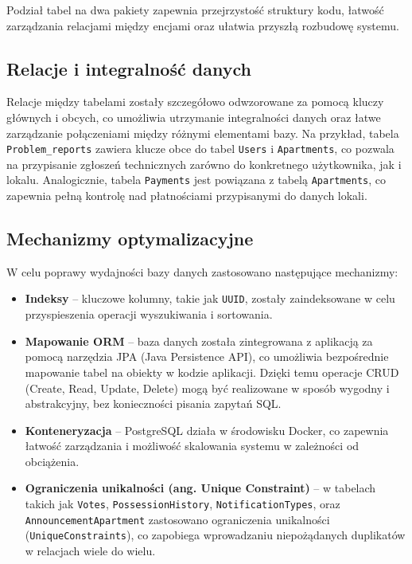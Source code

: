 Podział tabel na dwa pakiety zapewnia przejrzystość struktury kodu, łatwość zarządzania relacjami między encjami oraz ułatwia przyszłą rozbudowę systemu.


\subsection{Relacje i integralność danych}

Relacje między tabelami zostały szczegółowo odwzorowane za pomocą kluczy głównych i obcych, co umożliwia utrzymanie integralności danych oraz łatwe zarządzanie połączeniami między różnymi elementami bazy. Na przykład, tabela \texttt{Problem\_reports} zawiera klucze obce do tabel \texttt{Users} i \texttt{Apartments}, co pozwala na przypisanie zgłoszeń technicznych zarówno do konkretnego użytkownika, jak i lokalu. Analogicznie, tabela \texttt{Payments} jest powiązana z tabelą \texttt{Apartments}, co zapewnia pełną kontrolę nad płatnościami przypisanymi do danych lokali.

\subsection{Mechanizmy optymalizacyjne}

W celu poprawy wydajności bazy danych zastosowano następujące mechanizmy:
\begin{itemize}
    \item \textbf{Indeksy} -- kluczowe kolumny, takie jak \texttt{UUID}, zostały zaindeksowane w celu przyspieszenia operacji wyszukiwania i sortowania.
    \item \textbf{Mapowanie ORM} -- baza danych została zintegrowana z aplikacją za pomocą narzędzia JPA (Java Persistence API), co umożliwia bezpośrednie mapowanie tabel na obiekty w kodzie aplikacji. Dzięki temu operacje CRUD (Create, Read, Update, Delete) mogą być realizowane w sposób wygodny i abstrakcyjny, bez konieczności pisania zapytań SQL.
    \item \textbf{Konteneryzacja} -- PostgreSQL działa w środowisku Docker, co zapewnia łatwość zarządzania i możliwość skalowania systemu w zależności od obciążenia.
		\item \textbf{Ograniczenia unikalności (ang. Unique Constraint)} -- w tabelach takich jak \texttt{Votes}, \texttt{PossessionHistory}, \texttt{NotificationTypes}, oraz \texttt{AnnouncementApartment} zastosowano ograniczenia unikalności (\texttt{UniqueConstraints}), co zapobiega wprowadzaniu niepożądanych duplikatów w relacjach wiele do wielu.
\end{itemize}

